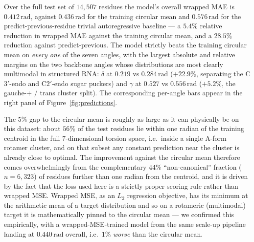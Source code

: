 \documentclass[11pt,a4paper]{article}
\begin{document}
Over the full test set of $14{,}507$ residues the model's overall
wrapped MAE is $0.412\,\mathrm{rad}$, against $0.436\,\mathrm{rad}$
for the training circular mean and $0.576\,\mathrm{rad}$ for the
predict-previous-residue trivial autoregressive baseline --- a
$5.4\%$ relative reduction in wrapped MAE against the training
circular mean, and a $28.5\%$ reduction against
predict-previous. The model strictly beats the training circular
mean on \emph{every one} of the seven angles, with the largest
absolute and relative margins on the two backbone angles whose
distributions are most clearly multimodal in structured RNA:
$\delta$ at $0.219$ vs $0.284\,\mathrm{rad}$ ($+22.9\%$,
separating the C$3'$-endo and C$2'$-endo sugar puckers) and
$\gamma$ at $0.527$ vs $0.556\,\mathrm{rad}$ ($+5.2\%$, the
gauche-$+$ / trans cluster split). The corresponding per-angle
bars appear in the right panel of Figure~\ref{fig:predictions}.

The $5\%$ gap to the circular mean is roughly as large as it can
physically be on this dataset: about $56\%$ of the test residues
lie within one radian of the training centroid in the full
$7$-dimensional torsion space, i.e.\ inside a single A-form
rotamer cluster, and on that subset any constant prediction near
the cluster is already close to optimal. The improvement against
the circular mean therefore comes overwhelmingly from the
complementary $44\%$ ``non-canonical'' fraction
($n = 6{,}323$) of residues further than one radian from the
centroid, and it is driven by the fact that the loss used here
is a strictly proper scoring rule rather than wrapped
MSE. Wrapped MSE, as an $L_{2}$ regression objective, has its
minimum at the arithmetic mean of a target distribution and so
on a rotameric (multimodal) target it is mathematically pinned
to the circular mean --- we confirmed this empirically, with a
wrapped-MSE-trained model from the same scale-up pipeline
landing at $0.440\,\mathrm{rad}$ overall, i.e.\ $1\%$
\emph{worse} than the circular mean.
\end{document}

